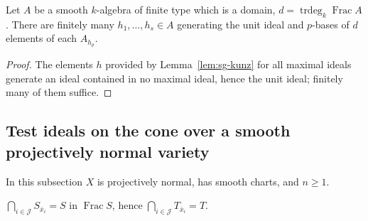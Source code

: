 \begin{corollary}\label{cor:sg-pbasis-cover}
\leanok
{}
Let $A$ be a smooth $k$-algebra of finite type which is a domain, $d=\operatorname{trdeg}_k\operatorname{Frac}A$. There are finitely many $h_1,\dots,h_s\in A$
generating the unit ideal and $p$-bases of $d$ elements of each $A_{h_\rho}$.
\end{corollary}

\begin{proof}
The elements $h$ provided by Lemma~\ref{lem:sg-kunz} for all maximal ideals generate an ideal contained in no maximal ideal, hence the unit ideal;
finitely many of them suffice.
\end{proof}

\subsection{Test ideals on the cone over a smooth projectively normal variety}\label{subsec:sg-cone}

In this subsection $X$ is projectively normal, has smooth charts, and $n\ge1$.

\begin{lemma}\label{lem:sg-proj-normal-sat}
\leanok
{}
$\bigcap_{i\in\mathcal J}S_{\bar x_i}=S$ in $\operatorname{Frac}S$, hence $\bigcap_{i\in\mathcal J}T_{\bar x_i}=T$.
\end{lemma}

